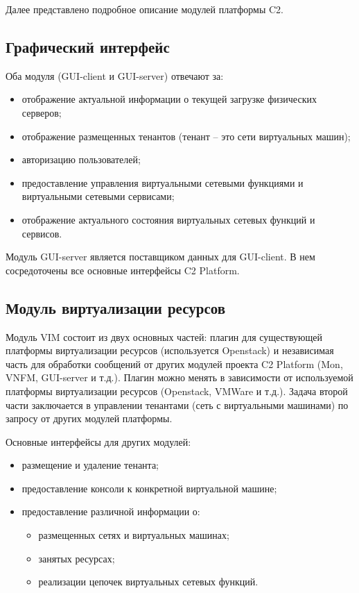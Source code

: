 \documentclass[oneside,final,14pt,a4paper]{extreport}
\begin{document}
Далее представлено подробное описание модулей платформы C2.

\subsection{Графический интерфейс}
Оба модуля (GUI-client и GUI-server) отвечают за:
\begin{itemize}
	\item отображение актуальной информации о текущей загрузке физических серверов;
	\item отображение размещенных тенантов (тенант -- это сети виртуальных машин);
	\item авторизацию пользователей;
	\item предоставление управления виртуальными сетевыми функциями и виртуальными сетевыми сервисами;
	\item отображение актуального состояния виртуальных сетевых функций и сервисов.
\end{itemize}

Модуль GUI-server является поставщиком данных для GUI-client. В нем сосредоточены все основные интерфейсы C2 Platform. 

\subsection{Модуль виртуализации ресурсов}
Модуль VIM состоит из двух основных частей: плагин для существующей платформы виртуализации ресурсов (используется Openstack) и независимая часть для обработки сообщений от других модулей проекта C2 Platform (Mon, VNFM, GUI-server и т.д.). Плагин можно менять в зависимости от используемой платформы виртуализации ресурсов (Openstack, VMWare и т.д.). Задача второй части заключается в управлении тенантами (сеть с виртуальными машинами) по запросу от других модулей платформы. 

Основные интерфейсы для других модулей: 
\begin{itemize}
    \item размещение и удаление тенанта;
    \item предоставление консоли к конкретной виртуальной машине;
    \item предоставление различной информации о:
    \begin{itemize}
        \item размещенных сетях и виртуальных машинах;
        \item занятых ресурсах;
        \item реализации цепочек виртуальных сетевых функций.
    \end{itemize}
\end{itemize}
\end{document}
